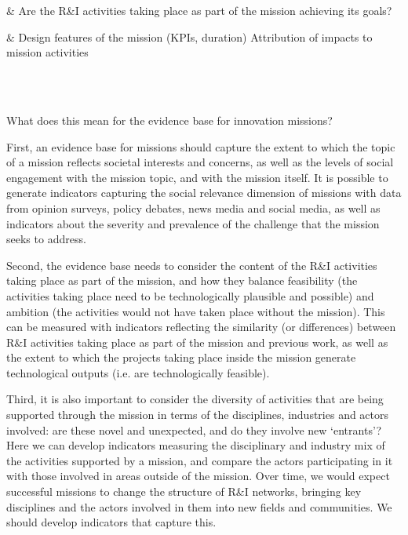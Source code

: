 \documentclass[11pt]{article}
\begin{document}
\begin{table}[!]
\begin{tabu}
 & Are the R\&I activities taking place as part of the mission achieving its goals?
 
 & Design features of the mission (KPIs, duration)
 \newline 
 \newline Attribution of impacts to mission activities
 
 \\
 \\
 \hline
\end{tabu}
\caption{Mission goals, measurements and indicators, based on (cite Mazzucatto)}
\label{tab:criteria}
\end{table}

What does this mean for the evidence base for innovation missions?

First, an evidence base for missions should capture the extent to which the topic of a mission reflects societal interests and concerns, as well as the levels of social engagement with the mission topic, and with the mission itself. It is possible to generate indicators capturing the social relevance dimension of missions with data from opinion surveys, policy debates, news media and social media, as well as indicators about the severity and prevalence of the challenge that the mission seeks to address.

Second, the evidence base needs to consider the content of the R\&I activities taking place as part of the mission, and how they balance feasibility (the activities taking place need to be technologically plausible and possible) and ambition (the activities would not have taken place without the mission). This can be measured with indicators reflecting the similarity (or differences) between R&I activities taking place as part of the mission and previous work, as well as the extent to which the projects taking place inside the mission
generate technological outputs (i.e. are technologically feasible).

Third, it is also important to consider the diversity of activities that are being supported through the mission in terms of the disciplines, industries and actors involved: are these novel and unexpected, and do they involve new `entrants’? Here we can develop indicators measuring the disciplinary and industry mix of the activities supported by a mission, and compare the actors participating in it with those involved in areas outside of the mission. Over time, we would expect successful missions to change the structure of R&I networks, bringing key disciplines and the actors involved in them into new fields and communities. We should develop indicators that capture this.
\end{document}
